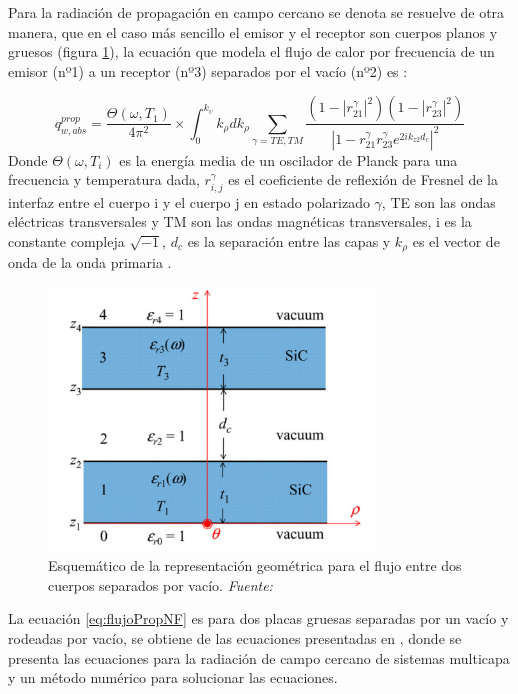Para la radiación de propagación en campo cercano se denota se resuelve de otra manera, que en el caso más sencillo el emisor y el receptor son cuerpos planos y gruesos (figura \ref{fig:campoCercanoEquation1}), la ecuación que modela el flujo de calor por frecuencia de un emisor (nº1) a un receptor (nº3) separados por el vacío (nº2) es \cite{nfTPV_equations}:

\begin{equation}
q_{w,abs}^{prop}=\dfrac{\Theta \left( \omega,T_1 \right)}{4 \pi^2}\times \int^{k_\upsilon}_{0} k_\rho d k_\rho \sum_{\gamma=TE,TM}\dfrac{\left( 1- \left| r_{21}^\gamma \right|^2\right) \left( 1-  \left| r_{23}^\gamma \right|^2 \right)}{\left| 1- r_{21}^\gamma r_{23}^\gamma e^{2ik_{z2}d_{c}} \right|^2}
\label{eq:flujoPropNF}
\end{equation}
Donde $\Theta \left( \omega,T_i \right)$ es la energía media de un oscilador de Planck para una frecuencia y temperatura dada, $r_{i,j}^\gamma$ es el coeficiente de reflexión de Fresnel de la interfaz entre el cuerpo i y el cuerpo j en estado polarizado $\gamma$, TE son las ondas eléctricas transversales y TM son las ondas magnéticas transversales, i es la constante compleja $\sqrt{-1}$, $d_c$ es la separación entre las capas y $k_\rho$ es el vector de onda de la onda primaria \cite{nfTPV_fullEquations}.\\
\begin{figure}[H]
	\centering
		\includegraphics[height=7cm]{figuras/campoCercanoEquation1.png}
	\caption[Esquemático de la representación geométrica para el flujo entre dos cuerpos separados por vacío]{Esquemático de la representación geométrica para el flujo entre dos cuerpos separados por vacío. \textit{Fuente: \cite{nfTPV_equations}}}
	\label{fig:campoCercanoEquation1}
\end{figure}
La ecuación \ref{eq:flujoPropNF} es para dos placas gruesas separadas por un vacío y rodeadas por vacío, se obtiene de las ecuaciones presentadas en \cite{nfTPV_fullEquations}, donde se presenta las ecuaciones para la radiación de campo cercano de sistemas multicapa y un método numérico para solucionar las ecuaciones.

